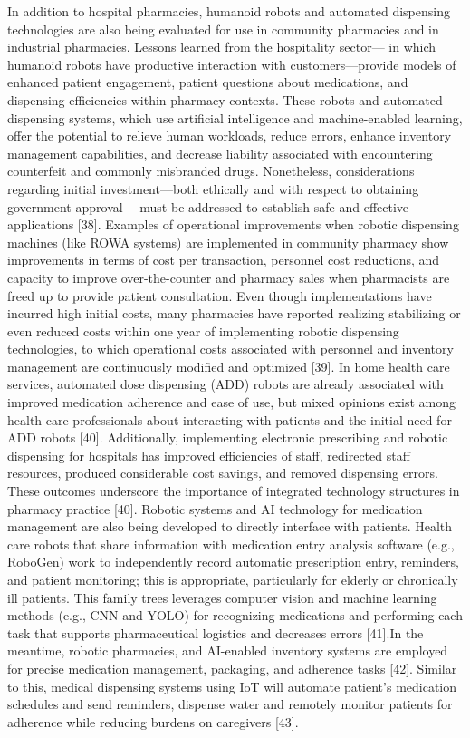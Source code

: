 In addition to hospital pharmacies, humanoid robots and automated dispensing technologies are also being evaluated for use in community pharmacies and in industrial pharmacies. Lessons learned from the hospitality sector— in which humanoid robots have productive interaction with customers—provide models of enhanced patient engagement, patient questions about medications, and dispensing efficiencies within pharmacy contexts. These robots and automated dispensing systems, which use artificial intelligence and machine-enabled learning, offer the potential to relieve human workloads, reduce errors, enhance inventory management capabilities, and decrease liability associated with encountering counterfeit and commonly misbranded drugs. Nonetheless, considerations regarding initial investment—both ethically and with respect to obtaining government approval— must be addressed to establish safe and effective applications [38].
Examples of operational improvements when robotic dispensing machines (like ROWA systems) are implemented in community pharmacy show improvements in terms of cost per transaction, personnel cost reductions, and capacity to improve over-the-counter and pharmacy sales when pharmacists are freed up to provide patient consultation. Even though implementations have incurred high initial costs, many pharmacies have reported realizing stabilizing or even reduced costs within one year of implementing robotic dispensing technologies, to which operational costs associated with personnel and inventory management are continuously modified and optimized [39].
In home health care services, automated dose dispensing (ADD) robots are already associated with improved medication adherence and ease of use, but mixed opinions exist among health care professionals about interacting with patients and the initial need for ADD robots [40]. Additionally, implementing electronic prescribing and robotic dispensing for hospitals has improved efficiencies of staff, redirected staff resources, produced considerable cost savings, and removed dispensing errors. These outcomes underscore the importance of integrated technology structures in pharmacy practice [40]. 
Robotic systems and AI technology for medication management are also being developed to directly interface with patients. Health care robots that share information with medication entry analysis software (e.g., RoboGen) work to independently record automatic prescription entry, reminders, and patient monitoring; this is appropriate, particularly for elderly or chronically ill patients. This family trees leverages computer vision and machine learning methods (e.g., CNN and YOLO) for recognizing medications and performing each task that supports pharmaceutical logistics and decreases errors [41].In the meantime, robotic pharmacies, and AI-enabled inventory systems are employed for precise medication management, packaging, and adherence tasks [42]. Similar to this, medical dispensing systems using IoT will automate patient's medication schedules and send reminders, dispense water and remotely monitor patients for adherence while reducing burdens on caregivers [43]. 
